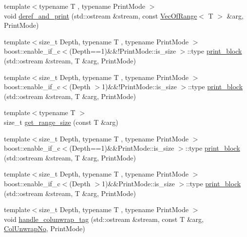 \begin{DoxyCompactItemize}
\item 
{\footnotesize template$<$typename T , typename Print\+Mode $>$ }\\void \hyperlink{namespacegnuplotio_ae768911c8adb77bfc080d5e4561573e6}{deref\+\_\+and\+\_\+print} (std\+::ostream \&stream, const \hyperlink{classgnuplotio_1_1_vec_of_range}{Vec\+Of\+Range}$<$ T $>$ \&arg, Print\+Mode)
\item 
{\footnotesize template$<$size\+\_\+t Depth, typename T , typename Print\+Mode $>$ }\\boost\+::enable\+\_\+if\+\_\+c$<$(Depth==1)\&\&!Print\+Mode\+::is\+\_\+size $>$\+::type \hyperlink{namespacegnuplotio_a631368ab4e255d2a5d563a41895f2edc}{print\+\_\+block} (std\+::ostream \&stream, T \&arg, Print\+Mode)
\item 
{\footnotesize template$<$size\+\_\+t Depth, typename T , typename Print\+Mode $>$ }\\boost\+::enable\+\_\+if\+\_\+c$<$(Depth $>$1)\&\&!Print\+Mode\+::is\+\_\+size $>$\+::type \hyperlink{namespacegnuplotio_a753a3551f418723c022be60c12379025}{print\+\_\+block} (std\+::ostream \&stream, T \&arg, Print\+Mode)
\item 
{\footnotesize template$<$typename T $>$ }\\size\+\_\+t \hyperlink{namespacegnuplotio_abb416b68686102ba84a2cb53c96b64e9}{get\+\_\+range\+\_\+size} (const T \&arg)
\item 
{\footnotesize template$<$size\+\_\+t Depth, typename T , typename Print\+Mode $>$ }\\boost\+::enable\+\_\+if\+\_\+c$<$(Depth==1)\&\&Print\+Mode\+::is\+\_\+size $>$\+::type \hyperlink{namespacegnuplotio_ae470a0908ac5f51527ff76ecbc1616d1}{print\+\_\+block} (std\+::ostream \&stream, T \&arg, Print\+Mode)
\item 
{\footnotesize template$<$size\+\_\+t Depth, typename T , typename Print\+Mode $>$ }\\boost\+::enable\+\_\+if\+\_\+c$<$(Depth $>$1)\&\&Print\+Mode\+::is\+\_\+size $>$\+::type \hyperlink{namespacegnuplotio_a94e97ca55dc1e5142dcc4457a5e1dd2d}{print\+\_\+block} (std\+::ostream \&stream, T \&arg, Print\+Mode)
\item 
{\footnotesize template$<$size\+\_\+t Depth, typename T , typename Print\+Mode $>$ }\\void \hyperlink{namespacegnuplotio_aef147f3d42f3f2c89cc4c895b8494150}{handle\+\_\+colunwrap\+\_\+tag} (std\+::ostream \&stream, const T \&arg, \hyperlink{structgnuplotio_1_1_col_unwrap_no}{Col\+Unwrap\+No}, Print\+Mode)
\item 

\end{DoxyCompactItemize}
